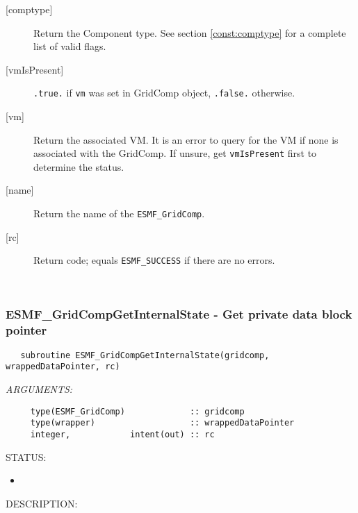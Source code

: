 \begin{description}
   \item[{[comptype]}]
     Return the Component type.
     See section \ref{const:comptype} for a complete list of valid flags.
   \item[{[vmIsPresent]}]
     {\tt .true.} if {\tt vm} was set in GridComp object,
     {\tt .false.} otherwise.
   \item[{[vm]}]
     Return the associated VM.
     It is an error to query for the VM if none is associated with
     the GridComp. If unsure, get {\tt vmIsPresent} first to determine
     the status.
   \item[{[name]}]
     Return the name of the {\tt ESMF\_GridComp}.
   \item[{[rc]}]
     Return code; equals {\tt ESMF\_SUCCESS} if there are no errors.
   \end{description}
   
 
\mbox{}\hrulefill\ 
 
\subsubsection [ESMF\_GridCompGetInternalState] {ESMF\_GridCompGetInternalState - Get private data block pointer}


  
\begin{verbatim}   subroutine ESMF_GridCompGetInternalState(gridcomp, wrappedDataPointer, rc)\end{verbatim}{\em ARGUMENTS:}
\begin{verbatim}     type(ESMF_GridComp)             :: gridcomp
     type(wrapper)                   :: wrappedDataPointer
     integer,            intent(out) :: rc\end{verbatim}
{\sf STATUS:}
   \begin{itemize}
   \item{}
   \end{itemize}
  
{\sf DESCRIPTION:\\ }



